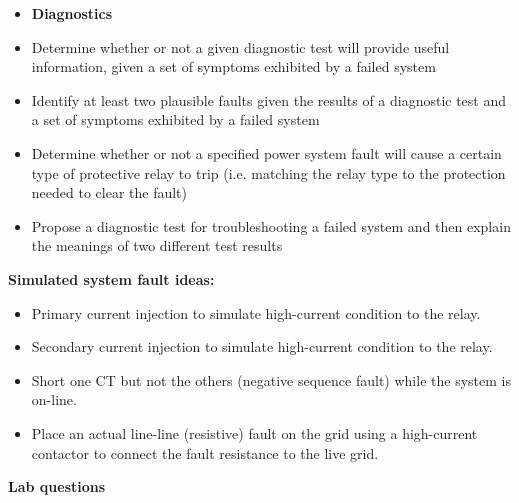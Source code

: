 \filbreak

\begin{itemize}
\item{} {\bf Diagnostics}
\item{} Determine whether or not a given diagnostic test will provide useful information, given a set of symptoms exhibited by a failed system
\item{} Identify at least two plausible faults given the results of a diagnostic test and a set of symptoms exhibited by a failed system
\item{} Determine whether or not a specified power system fault will cause a certain type of protective relay to trip (i.e. matching the relay type to the protection needed to clear the fault)
\item{} Propose a diagnostic test for troubleshooting a failed system and then explain the meanings of two different test results
\end{itemize}















\noindent
{\bf Simulated system fault ideas:}

\begin{itemize}
\goodbreak
\item{} Primary current injection to simulate high-current condition to the relay.
\item{} Secondary current injection to simulate high-current condition to the relay.
\item{} Short one CT but not the others (negative sequence fault) while the system is on-line.
\item{} Place an actual line-line (resistive) fault on the grid using a high-current contactor to connect the fault resistance to the live grid.
\end{itemize}











\vfil \eject

\noindent
{\bf Lab questions}

